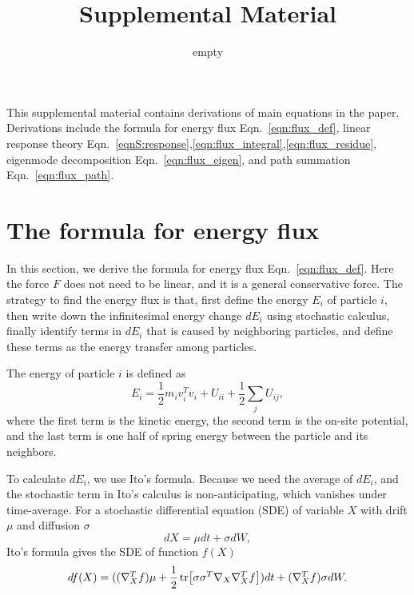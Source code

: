 \documentclass[
 amsmath,amssymb,
 aps,
 pre,
 longbibliography,
 10pt, onecolumn,
 notitlepage
]{revtex4-1}
\begin{document}
\newcommand{\eqnname}{Eqn.}
\newcommand{\secname}{Sec.}
\renewcommand{\theequation}{S\arabic{equation}}
\renewcommand{\thefigure}{S\arabic{figure}}
\renewcommand{\bibnumfmt}[1]{[S#1]}
\renewcommand{\citenumfont}[1]{S#1}

\title{Supplemental Material}

\author{empty}

\maketitle

This supplemental material contains derivations of main equations in the paper. Derivations include the formula for energy flux \eqnname~\eqref{eqn:flux_def}, linear response theory \eqnname~\eqref{eqnS:response},\eqref{eqn:flux_integral},\eqref{eqn:flux_residue}, eigenmode decomposition \eqnname~\eqref{eqn:flux_eigen}, and path summation \eqnname~\eqref{eqn:flux_path}.

\section{The formula for energy flux}
In this section, we derive the formula for energy flux \eqnname~\eqref{eqn:flux_def}.
Here the force $F$ does not need to be linear, and it is a general conservative force.
The strategy to find the energy flux is that, first define the energy $E_i$ of particle $i$, then write down the infinitesimal energy change $dE_i$ using stochastic calculus, finally identify terms in $dE_i$ that is caused by neighboring particles, and define these terms as the energy transfer among particles.

The energy of particle $i$ is defined as
\begin{equation} \label{eqnS:energy_individual}
E_i = \frac{1}{2}m_iv_i^Tv_i + U_{ii} + \frac{1}{2}\sum_jU_{ij},
\end{equation}
where the first term is the kinetic energy, the second term is the on-site potential, and the last term is one half of spring energy between the particle and its neighbors.

To calculate $dE_i$, we use Ito's formula. Because we need the average of $dE_i$, and the stochastic term in Ito's calculus is non-anticipating, which vanishes under time-average.
For a stochastic differential equation (SDE) of variable $X$ with drift $\mu$ and diffusion $\sigma$
\begin{equation} \label{eqnS:SDE_general}
dX = \mu dt + \sigma dW ,
\end{equation}
Ito's formula gives the SDE of function $f(X)$
\begin{equation} \label{eqnS:SDE_ito}
df(X) = ((\nabla_X^Tf)\mu + \frac{1}{2}\tr[\sigma \sigma^T \nabla_X\nabla_X^Tf])dt + (\nabla_X^Tf) \sigma dW .
\end{equation}
\end{document}
